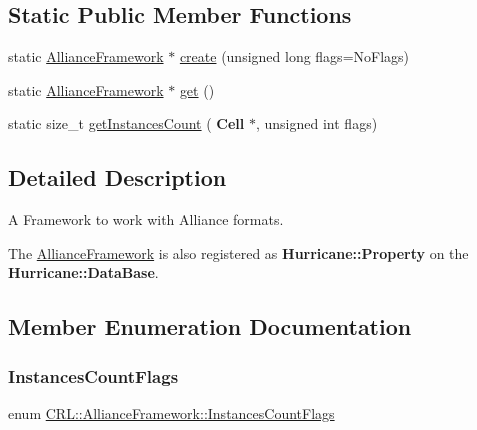\subsection*{Static Public Member Functions}
\begin{DoxyCompactItemize}
\item 
static \mbox{\hyperlink{classCRL_1_1AllianceFramework}{Alliance\+Framework}} $\ast$ \mbox{\hyperlink{classCRL_1_1AllianceFramework_a8cff32ced8cc163cadca885d8ed8a5fc}{create}} (unsigned long flags=No\+Flags)
\item 
static \mbox{\hyperlink{classCRL_1_1AllianceFramework}{Alliance\+Framework}} $\ast$ \mbox{\hyperlink{classCRL_1_1AllianceFramework_a976479af696a86c998c10d9d2604839d}{get}} ()
\item 
static size\+\_\+t \mbox{\hyperlink{classCRL_1_1AllianceFramework_a95aa8c6b8ab3f995daf22a0317324933}{get\+Instances\+Count}} (\textbf{ Cell} $\ast$, unsigned int flags)
\end{DoxyCompactItemize}


\subsection{Detailed Description}
A Framework to work with Alliance formats. 

The \mbox{\hyperlink{classCRL_1_1AllianceFramework}{Alliance\+Framework}} is also registered as \textbf{ Hurricane\+::\+Property} on the \textbf{ Hurricane\+::\+Data\+Base}. 

\subsection{Member Enumeration Documentation}
\mbox{\label{classCRL_1_1AllianceFramework_a03ef94e043d2d25eb7a6a5f1ae176432}} 
\subsubsection{\texorpdfstring{Instances\+Count\+Flags}{InstancesCountFlags}}
{\footnotesize\ttfamily enum \mbox{\hyperlink{classCRL_1_1AllianceFramework_a03ef94e043d2d25eb7a6a5f1ae176432}{C\+R\+L\+::\+Alliance\+Framework\+::\+Instances\+Count\+Flags}}}

